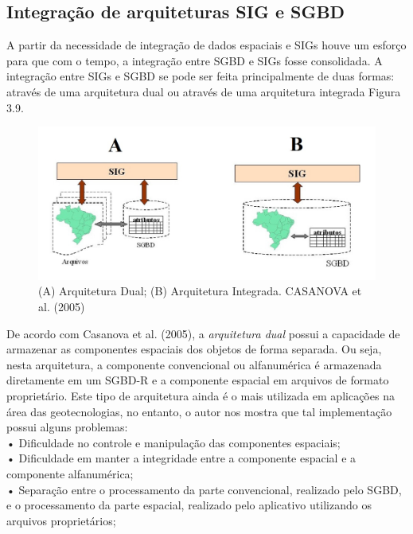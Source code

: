 		\subsection{Integração de arquiteturas SIG e SGBD}
		
		A partir da necessidade de integração de dados espaciais e SIGs houve um esforço para que com o tempo, a integração entre SGBD e SIGs fosse consolidada. A integração entre SIGs e SGBD se pode ser feita principalmente de duas formas: através de uma arquitetura dual ou através de uma arquitetura integrada Figura 3.9.
		
		\begin{figure}
			\centering
			\includegraphics[width=1\linewidth]{data/arquitetura_dua_integrada}
			\caption{(A) Arquitetura Dual; (B) Arquitetura Integrada. CASANOVA et al. (2005)}
			\label{fig:arquiteturaduaintegrada}
		\end{figure}
		
		De acordo com Casanova et al. (2005), a \textit{arquitetura dual} possui a capacidade de armazenar as componentes espaciais dos objetos de forma separada. Ou seja, nesta arquitetura, a componente convencional ou alfanumérica é armazenada diretamente em um SGBD-R e a componente espacial em arquivos de formato proprietário. Este tipo de arquitetura ainda é o mais utilizada em aplicações na área das geotecnologias, no entanto, o autor nos mostra que tal implementação possui alguns problemas: \\
		

			•	Dificuldade no controle e manipulação das componentes
						espaciais; \\
						
			•	Dificuldade em manter a integridade entre a componente espacial
						e a componente alfanumérica; \\
						
			•	Separação entre o processamento da parte convencional, realizado
						pelo SGBD, e o processamento da parte espacial, realizado pelo
						aplicativo utilizando os arquivos proprietários; \\
						
